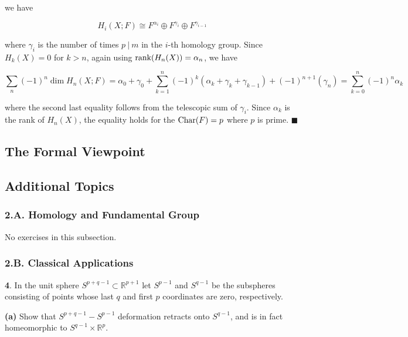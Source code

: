 \documentclass{article}
\newcommand{\R}{\mathbb{R}}
\newcommand{\Char}{\textnormal{Char}}
\begin{document}
we have

$$H_{i}(X; F)\cong F^{\alpha_{i}}\oplus F^{\gamma_{i}}\oplus F^{\gamma_{i-1}}$$

where $\gamma_{i}$ is the number of times $p\ |\ m$ in the $i$-th homology group. Since $H_{k}(X) = 0$ for $k > n$, again using $\textnormal{rank}(H_{n}(X)) = \alpha_{n}$, we have

$$\sum_{n}(-1)^{n}\dim H_{n}(X; F) = \alpha_{0} + \gamma_{0} + \sum_{k=1}^{n} (-1)^{k}(\alpha_{k} + \gamma_{k} + \gamma_{k-1}) + (-1)^{n+1}(\gamma_{n}) = \sum_{k=0}^{n} (-1)^{n}\alpha_{k}$$

where the second last equality follows from the telescopic sum of $\gamma_{i}$. Since $\alpha_{k}$ is the rank of $H_{n}(X)$, the equality holds for the $\Char (F) = p$ where $p$ is prime. $\blacksquare$
\bigskip
\bigskip

\subsection{The Formal Viewpoint}

\subsection*{Additional Topics}

\subsubsection*{2.A. Homology and Fundamental Group}

\tab No exercises in this subsection.
\bigskip
\bigskip

\subsubsection*{2.B. Classical Applications}

\tab \textbf{4}. In the unit sphere $S^{p+q-1}\subset \R^{p+1}$ let $S^{p-1}$ and $S^{q-1}$ be the subspheres consisting of points whose last $q$ and first $p$ coordinates are zero, respectively.
\medskip

\textbf{(a)} Show that $S^{p+q-1} - S^{p-1}$ deformation retracts onto $S^{q-1}$, and is in fact homeomorphic to $S^{q-1}\times \R^{p}$.
\medskip
\end{document}

